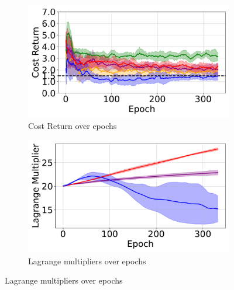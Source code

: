 \begin{figure}[H]
\begin{minipage}{0.48\textwidth}
        \begin{subfigure}{\linewidth}
            \centering
            \includegraphics[width=\linewidth]{figure/PointGoal/limit 1.5/EpCost.pdf}
            \caption{Cost Return over epochs}
        \end{subfigure}

        \begin{subfigure}{\linewidth}
            \centering
            \includegraphics[width=\linewidth]{figure/PointGoal/limit 1.5/lagrange.pdf}
            \caption{Lagrange multipliers over epochs}
        \end{subfigure}


\end{minipage}
\end{figure}
